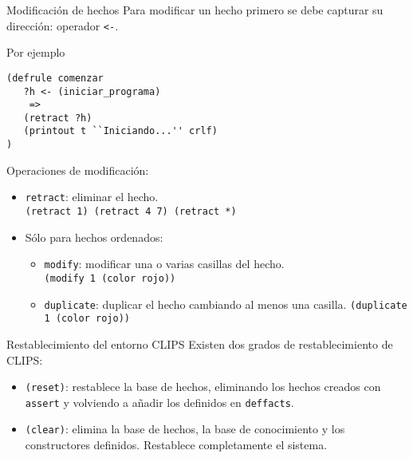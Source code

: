 \documentclass[usenames,dvipsnames,aspectratio=169]{beamer}
\begin{document}
\begin{frame}[fragile]{Modificación de hechos}
	Para modificar un hecho primero se debe capturar su dirección: operador \texttt{<-}.
	\begin{minipage}{.4\linewidth}
		\begin{exampleblock}{Por ejemplo}
		\begin{verbatim}
(defrule comenzar
   ?h <- (iniciar_programa)
    =>
   (retract ?h)
   (printout t ``Iniciando...'' crlf)
)
		\end{verbatim}
		\end{exampleblock}
	\end{minipage}
	\begin{minipage}{.5\linewidth}
		Operaciones de modificación:
		\begin{itemize}
			\item \texttt{retract}: eliminar el hecho.\\
			\texttt{(retract 1) (retract 4 7) (retract *)}
			\item Sólo para hechos ordenados:
			\begin{itemize}
				\item \texttt{modify}: modificar una o varias casillas del hecho.\\
				\texttt{(modify 1 (color rojo))}
				\item \texttt{duplicate}: duplicar el hecho cambiando al menos una casilla.
				\texttt{(duplicate 1 (color rojo))}
			\end{itemize}
		\end{itemize}
	\end{minipage}
\end{frame}

\begin{frame}{Restablecimiento del entorno CLIPS}
	Existen dos grados de restablecimiento de CLIPS:
	\begin{itemize}
		\item \texttt{(reset)}: restablece la base de hechos, eliminando los hechos creados con \texttt{assert} y volviendo a añadir los definidos en \texttt{deffacts}.
		
		\item \texttt{(clear)}: elimina la base de hechos, la base de conocimiento y los constructores definidos. Restablece completamente el sistema.
	\end{itemize}
\end{frame}
\end{document}
